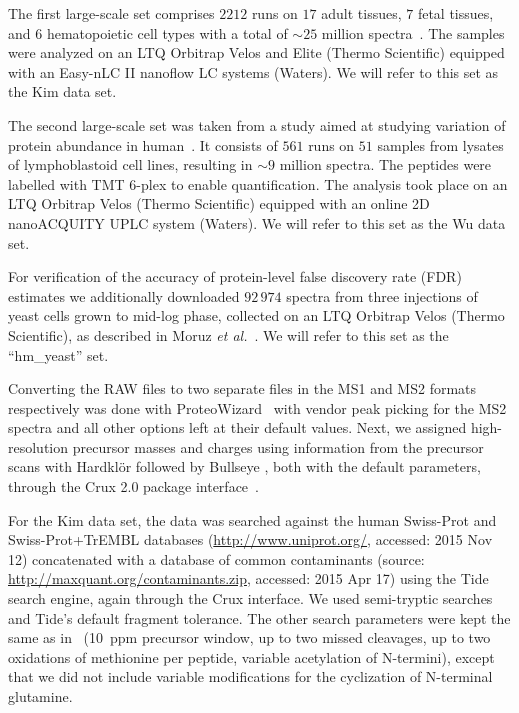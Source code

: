 \documentclass{article}
\begin{document}
The first large-scale set comprises $2212$ runs on $17$ adult tissues,
$7$ fetal tissues, and $6$ hematopoietic cell types with a total of
${\sim}25$ million spectra~\cite{kim2014draft}. The samples were
analyzed on an LTQ Orbitrap Velos and Elite (Thermo Scientific)
equipped with an Easy-nLC II nanoflow LC systems (Waters). We will
refer to this set as the Kim data set.

The second large-scale set was taken from a study aimed at studying
variation of protein abundance in human~\cite{wu2013}. It consists
of $561$ runs on $51$ samples from lysates of lymphoblastoid cell
lines, resulting in ${\sim}9$ million spectra. The peptides were
labelled with TMT 6-plex to enable quantification. The analysis took
place on an LTQ Orbitrap Velos (Thermo Scientific) equipped with an
online 2D nanoACQUITY UPLC system (Waters). We will refer to this set
as the Wu data set.

For verification of the accuracy of protein-level false discovery rate 
(FDR) estimates we additionally downloaded $92\,974$ spectra from 
three injections of yeast cells grown to mid-log phase, collected on 
an LTQ Orbitrap Velos (Thermo Scientific), as described in Moruz {\em 
et al.}~\cite{moruz2013}.  We will refer to this set as the 
``hm\_yeast'' set.

Converting the RAW files to two separate files in the MS1 and MS2 
formats~\cite{mcdonald2004ms1} respectively was done with 
ProteoWizard~\cite{kessner2008} with vendor peak picking for the MS2 
spectra and all other options left at their default values.  Next, we 
assigned high-resolution precursor masses and charges using 
information from the precursor scans with Hardkl\"{o}r 
\cite{hoopmann2007} followed by Bullseye \cite{hsieh2009}, both with 
the default parameters, through the Crux 2.0 package 
interface~\cite{mcilwain2014}.

For the Kim data set, the data was searched against the human
Swiss-Prot and Swiss-Prot+TrEMBL databases
(\url{http://www.uniprot.org/}, accessed: 2015 Nov 12)
concatenated with a database of common contaminants (source:
\url{http://maxquant.org/contaminants.zip}, accessed: 2015 Apr 17)
using the Tide search engine, again through the Crux interface. We
used semi-tryptic searches and Tide's default fragment tolerance. The
other search parameters were kept the same as in~\cite{kim2014draft}
(10~ppm precursor window, up to two missed cleavages, up to two
oxidations of methionine per peptide, variable acetylation of
N-termini), except that we did not include variable modifications for
the cyclization of N-terminal glutamine. 
\end{document}
